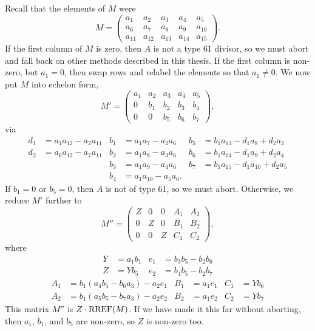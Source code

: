 Recall that the elements of $M$ were
\[ M =
\begin{pmatrix}
  a_1 & a_2 & a_3 & a_4 & a_5 \\
  a_6 & a_7 & a_8 & a_9 & a_{10} \\
  a_{11} & a_{12} & a_{13} & a_{14} & a_{15}
\end{pmatrix}. \]
If the first column of $M$ is zero, then $A$ is not a type 61 divisor,
so we must abort and fall back on other methods described in this thesis.
If the first column is non-zero, but $a_1 = 0$, then swap rows and relabel the elements so that $a_1 \neq 0$.
We now put $M$ into echelon form,
\[ M' =
\begin{pmatrix}
  a_1 & a_2 & a_3 & a_4 & a_5 \\
    0 & b_1 & b_2 & b_3 & b_4 \\
    0 &   0 & b_5 & b_6 & b_7
\end{pmatrix}, \]
via
\begin{align*}
  d_1 &= a_1a_{12} - a_2a_{11} & b_1 &= a_1a_7    - a_2a_6 & b_5 &= b_1a_{13} - d_1a_8    + d_2a_3 \\
  d_2 &= a_6a_{12} - a_7a_{11} & b_2 &= a_1a_8    - a_3a_6 & b_6 &= b_1a_{14} - d_1a_9    + d_2a_4 \\
      &                        & b_3 &= a_1a_9    - a_4a_6 & b_7 &= b_1a_{15} - d_1a_{10} + d_2a_5 \\
      &                        & b_4 &= a_1a_{10} - a_5a_6.
\end{align*}
If $b_1 = 0$ or $b_5 = 0$, then $A$ is not of type 61, so we must abort.
Otherwise, we reduce $M'$ further to
\[ M'' =
\begin{pmatrix}
  Z & 0 & 0 & A_1 & A_2 \\
  0 & Z & 0 & B_1 & B_2 \\
  0 & 0 & Z & C_1 & C_2
\end{pmatrix}, \]
where
\begin{align*}
  Y &= a_1b_1 & e_1 &= b_3b_5 - b_2b_6 \\
  Z &= Yb_5   & e_2 &= b_4b_5 - b_2b_7
\end{align*}
\begin{align*}
  A_1 &= b_1(a_4b_5 - b_6a_3) - a_2e_1 & B_1 &= a_1e_1 & C_1 &= Yb_6 \\
  A_2 &= b_1(a_5b_5 - b_7a_3) - a_2e_2 & B_2 &= a_1e_2 & C_2 &= Yb_7
\end{align*}
This matrix $M''$ is $Z \cdot \operatorname{RREF}(M)$.
If we have made it this far without aborting, then $a_1$, $b_1$, and $b_5$ are non-zero, so $Z$ is non-zero too.

